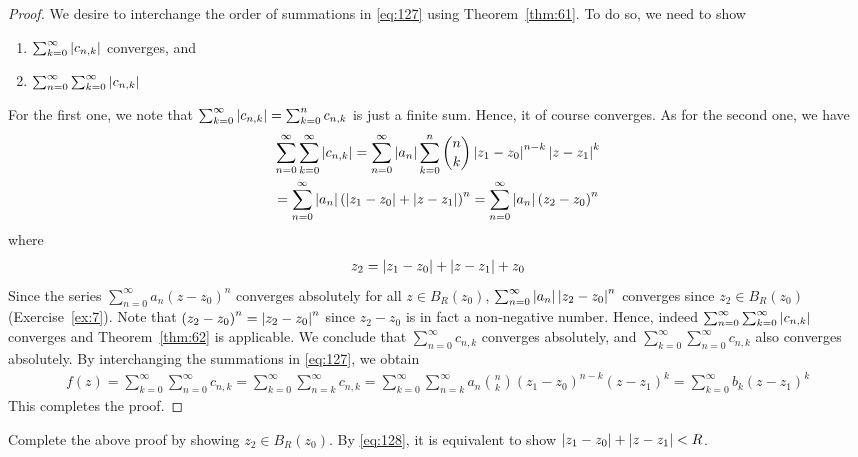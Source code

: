 \documentclass[thmcnt=section, 12pt]{my-elegantbook}
\begin{document}
\begin{proof}
    We desire to interchange the order of summations in \eqref{eq:127} using Theorem~\ref{thm:61}. To do so, we need to show 
    \begin{enumerate}
        \item $\sum_{k=0}^\infty \left\lvert c_{n,k} \right\rvert$ converges, and 
        \item $\sum_{n=0}^\infty \sum_{k=0}^\infty \left\lvert c_{n,k} \right\rvert$ 
    \end{enumerate}
    For the first one, we note that $\sum_{k=0}^\infty \left\lvert c_{n,k} \right\rvert = \sum_{k=0}^n c_{n,k}$ is just a finite sum. Hence, it of course converges. As for the second one, we have 
    \begin{multline*}
        \sum_{n=0}^\infty \sum_{k=0}^\infty \left\lvert c_{n,k} \right\rvert
        = \sum_{n=0}^\infty \left\lvert a_n \right\rvert \sum_{k=0}^n \binom{n}{k} \left\lvert z_1 - z_0 \right\rvert^{n-k} \left\lvert z - z_1 \right\rvert^k \\
        = \sum_{n=0}^\infty \left\lvert a_n \right\rvert \left( \left\lvert z_1 - z_0 \right\rvert + \left\lvert z - z_1 \right\rvert \right)^n
        = \sum_{n=0}^\infty \left\lvert a_n \right\rvert \left( z_2 - z_0 \right)^n
    \end{multline*}
    where 
    \begin{align}
        z_2 = \left\lvert z_1 - z_0 \right\rvert + \left\lvert z - z_1 \right\rvert + z_0
        \label{eq:128}
    \end{align}
    Since the series $\sum_{n=0}^\infty a_n (z - z_0)^n$ converges absolutely for all $z \in B_{R}(z_0)$, $\sum_{n=0}^\infty \left\lvert a_n \right\rvert \left\lvert z_2 - z_0 \right\rvert^n$ converges since $z_2 \in B_R(z_0)$ (Exercise~\ref{ex:7}). Note that $\left( z_2 - z_0 \right)^n = \left\lvert z_2 - z_0 \right\rvert^n$ since $z_2 - z_0$ is in fact a non-negative number. Hence, indeed $\sum_{n=0}^\infty \sum_{k=0}^\infty \left\lvert c_{n,k} \right\rvert$ converges and Theorem~\ref{thm:62} is applicable. We conclude that $\sum_{n=0}^\infty c_{n,k}$ converges absolutely, and $\sum_{k=0}^\infty \sum_{n=0}^\infty c_{n,k}$ also converges absolutely. By interchanging the summations in \eqref{eq:127}, we obtain
    \begin{align*}
        f(z) = \sum_{k=0}^\infty \sum_{n=0}^\infty c_{n,k}
        = \sum_{k=0}^\infty \sum_{n=k}^\infty c_{n,k}
        = \sum_{k=0}^\infty \sum_{n=k}^\infty a_n \binom{n}{k} (z_1 - z_0)^{n-k} (z - z_1)^k
        = \sum_{k=0}^\infty b_k (z - z_1)^k
    \end{align*}
    This completes the proof.
\end{proof}

\begin{exercise}
    Complete the above proof by showing $z_2 \in B_R(z_0)$. By \eqref{eq:128}, it is equivalent to show $\left\lvert z_1 - z_0 \right\rvert + \left\lvert z - z_1 \right\rvert < R$.
    \label{ex:7}
\end{exercise}
\end{document}
